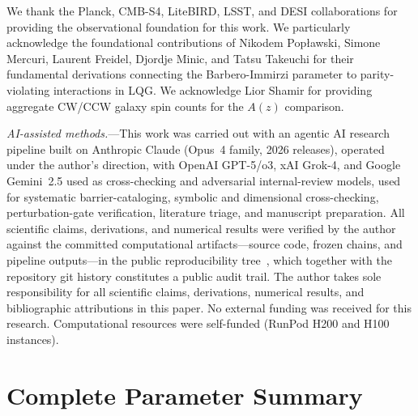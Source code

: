 \documentclass[aps,prd,twocolumn,superscriptaddress,showpacs,preprintnumbers,nofootinbib,longbibliography,floatfix]{revtex4-2}
\begin{document}
\begin{acknowledgments}
We thank the Planck, CMB-S4, LiteBIRD, LSST, and DESI collaborations for
providing the observational foundation for this work. We particularly acknowledge
the foundational contributions of Nikodem Pop\l{}awski, Simone Mercuri, Laurent
Freidel, Djordje Minic, and Tatsu Takeuchi for their fundamental derivations
connecting the Barbero-Immirzi parameter to parity-violating interactions in LQG.
We acknowledge Lior Shamir for providing aggregate CW/CCW galaxy spin counts for
the $A(z)$ comparison.

\emph{AI-assisted methods.}---This work was carried out with an agentic
AI research pipeline built on Anthropic Claude (Opus~4 family, 2026
releases), operated under the author's direction, with OpenAI GPT-5/o3,
xAI Grok-4, and Google Gemini~2.5 used as cross-checking and adversarial
internal-review models, used for systematic barrier-cataloging, symbolic and dimensional
cross-checking, perturbation-gate verification, literature triage, and
manuscript preparation. All scientific claims, derivations, and numerical
results were verified by the author against the committed computational
artifacts---source code, frozen chains, and pipeline outputs---in the public
reproducibility tree~\cite{BigBounceRepro}, which together with the repository
git history constitutes a public audit trail. The author takes sole
responsibility for all scientific claims, derivations, numerical results, and
bibliographic attributions in this paper. No external funding was
received for this research. Computational resources were self-funded (RunPod H200
and H100 instances).
\end{acknowledgments}


\appendix

\section{Complete Parameter Summary}\label{app:params}
\end{document}
